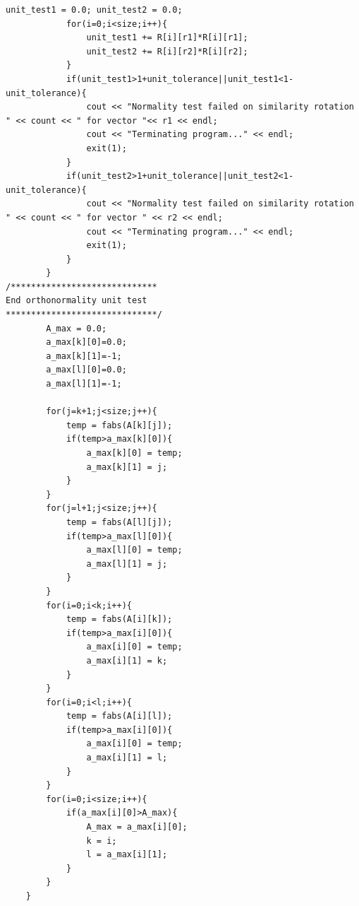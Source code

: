 \documentclass[11pt,a4paper]{article}
\begin{document}
{\begin{lstlisting}[title={eigensolver-unittest.cpp}]
			unit_test1 = 0.0; unit_test2 = 0.0;
			for(i=0;i<size;i++){
				unit_test1 += R[i][r1]*R[i][r1];
				unit_test2 += R[i][r2]*R[i][r2];
			}
			if(unit_test1>1+unit_tolerance||unit_test1<1-unit_tolerance){
				cout << "Normality test failed on similarity rotation " << count << " for vector "<< r1 << endl;
				cout << "Terminating program..." << endl;
				exit(1);			
			}
			if(unit_test2>1+unit_tolerance||unit_test2<1-unit_tolerance){
				cout << "Normality test failed on similarity rotation " << count << " for vector " << r2 << endl;			
				cout << "Terminating program..." << endl;
				exit(1);			
			}
		}
/*****************************
End orthonormality unit test
******************************/
		A_max = 0.0;
		a_max[k][0]=0.0;
		a_max[k][1]=-1;
		a_max[l][0]=0.0;
		a_max[l][1]=-1;

		for(j=k+1;j<size;j++){
			temp = fabs(A[k][j]);
			if(temp>a_max[k][0]){
				a_max[k][0] = temp;
				a_max[k][1] = j;
			}
		}
		for(j=l+1;j<size;j++){
			temp = fabs(A[l][j]);
			if(temp>a_max[l][0]){
				a_max[l][0] = temp;
				a_max[l][1] = j;
			}
		}
		for(i=0;i<k;i++){
			temp = fabs(A[i][k]);
			if(temp>a_max[i][0]){
				a_max[i][0] = temp;
				a_max[i][1] = k;
			}
		}
		for(i=0;i<l;i++){
			temp = fabs(A[i][l]);
			if(temp>a_max[i][0]){
				a_max[i][0] = temp;
				a_max[i][1] = l;
			}
		}			
		for(i=0;i<size;i++){
			if(a_max[i][0]>A_max){
				A_max = a_max[i][0];
				k = i;
				l = a_max[i][1];
			}
		}
	}

	
			


\end{lstlisting}}
\end{document}
